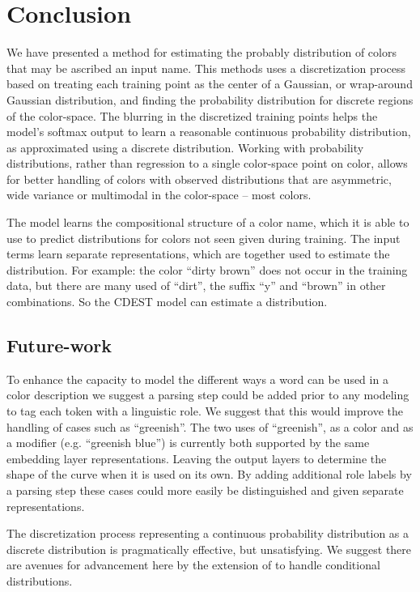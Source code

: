 \documentclass[11pt,letterpaper]{article}
\newcommand{\textcite}{\newcite}
\begin{document}
\section{Conclusion}\label{sec:conclusion}
We have presented a method for estimating the probably distribution of colors that may be ascribed an input name.
This methods uses a discretization process based on treating each training point as the center of a Gaussian, or wrap-around Gaussian distribution, and finding the probability distribution for discrete regions of the color-space.
The blurring in the discretized training points helps the model's softmax output to learn a reasonable continuous probability distribution, as approximated using a discrete distribution.
Working with probability distributions, rather than regression to a single color-space point on color, allows for better handling of colors with observed distributions that are asymmetric, wide variance or multimodal in the color-space -- most colors.

The model learns the compositional structure of a color name, which it is able to use to predict distributions for colors not seen given during training.
The input terms learn separate representations, which are together used to estimate the distribution.
For example: the color ``dirty brown'' does not occur in the training data, but there are many used of ``dirt'', the suffix ``y'' and ``brown'' in other combinations.
So the CDEST model can estimate a distribution.



\subsection{Future-work}
To enhance the capacity to model the different ways a word can be used in a color description we suggest a parsing step could be added prior to any modeling to tag each token with a linguistic role.
We suggest that this would improve the handling of cases such as ``greenish''.
The two uses of ``greenish'', as a color and as a modifier (e.g. ``greenish blue'') is currently both supported by the same embedding layer representations.
Leaving the output layers to determine the shape of the curve when it is used on its own.
By adding additional role labels by a parsing step these cases could more easily be distinguished and given separate representations.


The discretization process representing a continuous probability distribution as a discrete distribution is pragmatically effective, but unsatisfying.
We suggest there are avenues for advancement here by the extension of \textcite{magdon1998neural} to handle conditional distributions.


\clearpage



\end{document}
